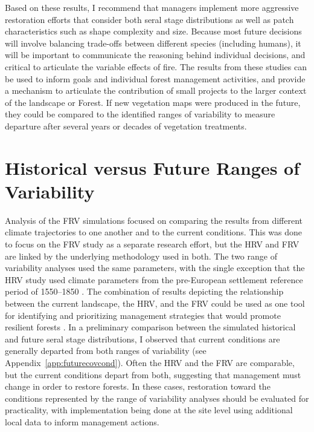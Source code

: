 Based on these results, I recommend that managers implement more aggressive restoration efforts that consider both seral stage distributions as well as patch characteristics such as shape complexity and size. Because most future decisions will involve balancing trade-offs between different species (including humans), it will be important to communicate the reasoning behind individual decisions, and critical to articulate the variable effects of fire. The results from these studies can be used to inform goals and individual forest management activities, and provide a mechanism to articulate the contribution of small projects to the larger context of the landscape or Forest. If new vegetation maps were produced in the future, they could be compared to the identified ranges of variability to measure departure after several years or decades of vegetation treatments.


\section{Historical versus Future Ranges of Variability}
Analysis of the FRV simulations focused on comparing the results from different climate trajectories to one another and to the current conditions. This was done to focus on the FRV study as a separate research effort, but the HRV and FRV are linked by the underlying methodology used in both. The two range of variability analyses used the same parameters, with the single exception that the HRV study used climate parameters from the pre-European settlement reference period of 1550--1850 \citep{Safford2013}. The combination of results depicting the relationship between the current landscape, the HRV, and the FRV could be used as one tool for identifying and prioritizing management strategies that would promote resilient forests \citep{Keane2009}. In a preliminary comparison between the simulated historical and future seral stage distributions, I observed that current conditions are generally departed from both ranges of variability (see Appendix~\ref{app:futurecovcond}). Often the HRV and the FRV are comparable, but the current conditions depart from both, suggesting that management must change in order to restore forests. In these cases, restoration toward the conditions represented by the range of variability analyses should be evaluated for practicality, with implementation being done at the site level using additional local data to inform management actions.

